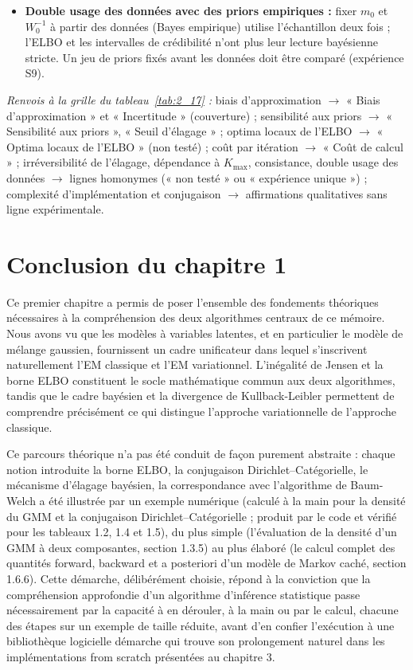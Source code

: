 \begin{itemize}
\item \textbf{Double usage des données avec des priors empiriques : }fixer $m_0$ et $W_0^{-1}$ à partir des données (Bayes empirique) utilise l'échantillon deux fois ; l'ELBO et les intervalles de crédibilité n'ont plus leur lecture bayésienne stricte. Un jeu de priors fixés avant les données doit être comparé (expérience S9).
\end{itemize}
\par\noindent\emph{Renvois à la grille du tableau~\ref{tab:2_17} :} biais d'approximation $\to$ « Biais d'approximation » et « Incertitude » (couverture) ; sensibilité aux priors $\to$ « Sensibilité aux priors », « Seuil d'élagage » ; optima locaux de l'ELBO $\to$ « Optima locaux de l'ELBO » (non testé) ; coût par itération $\to$ « Coût de calcul » ; irréversibilité de l'élagage, dépendance à $K_{\max}$, consistance, double usage des données $\to$ lignes homonymes (« non testé » ou « expérience unique ») ; complexité d'implémentation et conjugaison $\to$ affirmations qualitatives sans ligne expérimentale.
\section{Conclusion du chapitre 1}
Ce premier chapitre a permis de poser l'ensemble des fondements théoriques nécessaires à la compréhension des deux algorithmes centraux de ce mémoire. Nous avons vu que les modèles à variables latentes, et en particulier le modèle de mélange gaussien, fournissent un cadre unificateur dans lequel s'inscrivent naturellement l'EM classique et l'EM variationnel. L'inégalité de Jensen et la borne ELBO constituent le socle mathématique commun aux deux algorithmes, tandis que le cadre bayésien et la divergence de Kullback-Leibler permettent de comprendre précisément ce qui distingue l'approche variationnelle de l'approche classique.

Ce parcours théorique n'a pas été conduit de façon purement abstraite : chaque notion introduite  la borne ELBO, la conjugaison Dirichlet--Catégorielle, le mécanisme d'élagage bayésien, la correspondance avec l'algorithme de Baum-Welch  a été illustrée par un exemple numérique (calculé à la main pour la densité du GMM et la conjugaison Dirichlet--Catégorielle ; produit par le code et vérifié pour les tableaux 1.2, 1.4 et 1.5), du plus simple (l'évaluation de la densité d'un GMM à deux composantes, section 1.3.5) au plus élaboré (le calcul complet des quantités forward, backward et a posteriori d'un modèle de Markov caché, section 1.6.6). Cette démarche, délibérément choisie, répond à la conviction que la compréhension approfondie d'un algorithme d'inférence statistique passe nécessairement par la capacité à en dérouler, à la main ou par le calcul, chacune des étapes sur un exemple de taille réduite, avant d'en confier l'exécution à une bibliothèque logicielle  démarche qui trouve son prolongement naturel dans les implémentations from scratch présentées au chapitre 3.

